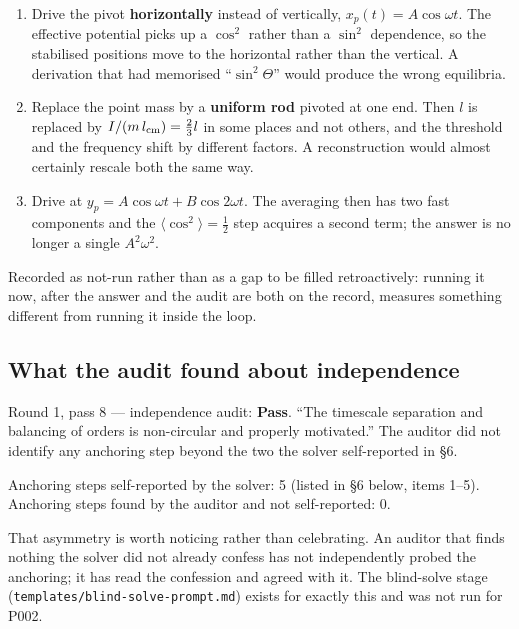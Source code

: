 \documentclass[11pt,a4paper]{article}
\providecommand{\passthrough}[1]{#1}
\providecommand{\tightlist}{\setlength{\itemsep}{0pt}\setlength{\parskip}{0pt}}
\begin{document}
\begin{enumerate}
\def\labelenumi{\arabic{enumi}.}
\tightlist
\item
  Drive the pivot \textbf{horizontally} instead of vertically,
  \(x_p(t)=A\cos\omega t\). The effective potential picks up a \(\cos^2\) rather
  than a \(\sin^2\) dependence, so the stabilised positions move to the
  horizontal rather than the vertical. A derivation that had memorised
  ``\(\sin^2\Theta\)'' would produce the wrong equilibria.
\item
  Replace the point mass by a \textbf{uniform rod} pivoted at one end. Then \(l\) is
  replaced by \(I/(m\,l_{\rm cm}) = \tfrac{2}{3}l\) in some places and not
  others, and the threshold and the frequency shift by different factors. A
  reconstruction would almost certainly rescale both the same way.
\item
  Drive at \(y_p = A\cos\omega t + B\cos 2\omega t\). The averaging then has two
  fast components and the \(\langle\cos^2\rangle = \tfrac12\) step acquires a
  second term; the answer is no longer a single \(A^2\omega^2\).
\end{enumerate}

Recorded as not-run rather than as a gap to be filled retroactively: running it
now, after the answer and the audit are both on the record, measures something
different from running it inside the loop.

\hypertarget{what-the-audit-found-about-independence}{%
\subsection{What the audit found about independence}\label{what-the-audit-found-about-independence}}

Round 1, pass 8 --- independence audit: \textbf{Pass}. ``The timescale separation and
balancing of orders is non-circular and properly motivated.'' The auditor did not
identify any anchoring step beyond the two the solver self-reported in §6.

Anchoring steps self-reported by the solver: 5 (listed in §6 below, items 1--5).
Anchoring steps found by the auditor and not self-reported: 0.

That asymmetry is worth noticing rather than celebrating. An auditor that finds
nothing the solver did not already confess has not independently probed the
anchoring; it has read the confession and agreed with it. The blind-solve stage
(\passthrough{\lstinline!templates/blind-solve-prompt.md!}) exists for exactly this and was not run for
P002.
\end{document}
